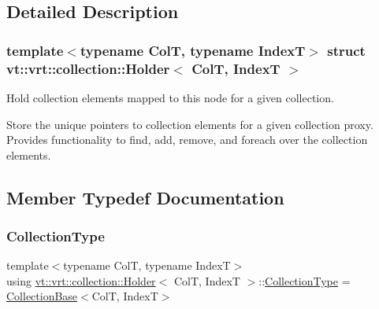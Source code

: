 \subsection{Detailed Description}
\subsubsection*{template$<$typename ColT, typename IndexT$>$\newline
struct vt\+::vrt\+::collection\+::\+Holder$<$ Col\+T, Index\+T $>$}

Hold collection elements mapped to this node for a given collection. 

Store the unique pointers to collection elements for a given collection proxy. Provides functionality to find, add, remove, and foreach over the collection elements. 

\subsection{Member Typedef Documentation}
\mbox{\label{structvt_1_1vrt_1_1collection_1_1_holder_a38b4a4bfc4408cf28918c32433c80aac}} 
\subsubsection{\texorpdfstring{Collection\+Type}{CollectionType}}
{\footnotesize\ttfamily template$<$typename ColT, typename IndexT$>$ \\
using \hyperlink{structvt_1_1vrt_1_1collection_1_1_holder}{vt\+::vrt\+::collection\+::\+Holder}$<$ ColT, IndexT $>$\+::\hyperlink{structvt_1_1vrt_1_1collection_1_1_holder_a38b4a4bfc4408cf28918c32433c80aac}{Collection\+Type} =  \hyperlink{structvt_1_1vrt_1_1collection_1_1_collection_base}{Collection\+Base}$<$ColT, IndexT$>$}

\mbox{\label{structvt_1_1vrt_1_1collection_1_1_holder_ae3bb115b69cf47e14a4e8441cebe9142}} 
